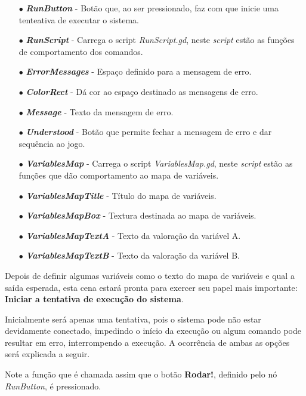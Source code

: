 \begin{itemize}
    \item[$\bullet$]
        \textbf{\textit{RunButton}} - Botão que, ao ser pressionado, faz com que
        inicie uma tenteativa de executar o sistema.
    \item[$\bullet$]
        \textbf{\textit{RunScript}} - Carrega o script \textit{RunScript.gd},
        neste \textit{script} estão as funções de comportamento dos comandos.
    \item[$\bullet$]
        \textbf{\textit{ErrorMessages}} - Espaço definido para a mensagem de 
        erro.
    \item[$\bullet$] 
        \textbf{\textit{ColorRect}} - Dá cor ao espaço destinado as mensagens de 
        erro.
    \item[$\bullet$]
        \textbf{\textit{Message}} - Texto da mensagem de erro.
    \item[$\bullet$]
        \textbf{\textit{Understood}} - Botão que permite fechar a mensagem de 
        erro e dar sequência ao jogo.
    \item[$\bullet$] 
        \textbf{\textit{VariablesMap}} - Carrega o script 
        \textit{VariablesMap.gd}, neste \textit{script} estão as funções que
        dão comportamento ao mapa de variáveis.
    \item[$\bullet$] 
        \textbf{\textit{VariablesMapTitle}} - Título do mapa de variáveis.
    \item[$\bullet$]
        \textbf{\textit{VariablesMapBox}} - Textura destinada ao mapa de
        variáveis.
    \item[$\bullet$] 
        \textbf{\textit{VariablesMapTextA}} - Texto da valoração da variável A.
    \item[$\bullet$] 
        \textbf{\textit{VariablesMapTextB}} - Texto da valoração da variável B.
\end{itemize}

Depois de definir algumas variáveis como o texto do mapa de variáveis e qual a
saída esperada, esta cena estará pronta para exercer seu papel mais importante:
\textbf{Iniciar a tentativa de execução do sistema}.

Inicialmente será apenas uma tentativa, pois o sistema pode não estar 
devidamente conectado, impedindo o início da execução ou algum comando pode 
resultar em erro, interrompendo a execução. A ocorrência de ambas as opções 
será explicada a seguir.

Note a função que é chamada assim que o botão \textbf{Rodar!}, definido pelo nó 
\textit{RunButton}, é pressionado.

